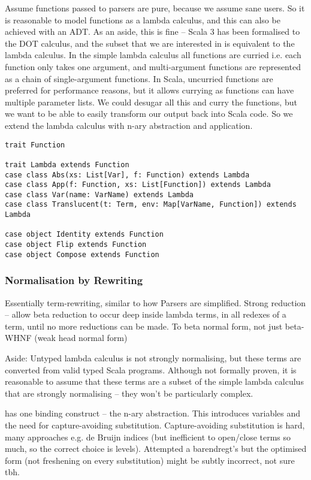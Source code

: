 \documentclass[../../main.tex]{subfiles}
\begin{document}
Assume functions passed to parsers are pure, because we assume sane users.
So it is reasonable to model functions as a lambda calculus, and this can also be achieved with an ADT.
As an aside, this is fine -- Scala 3 has been formalised to the DOT calculus, and the subset that we are interested in is equivalent to the lambda calculus.
In the simple lambda calculus all functions are curried i.e. each function only takes one argument, and multi-argument functions are represented as a chain of single-argument functions.
In Scala, uncurried functions are preferred for performance reasons, but it allows currying as functions can have multiple parameter lists.
We could desugar all this and curry the functions, but we want to be able to easily transform our output back into Scala code.
So we extend the lambda calculus with n-ary abstraction and application.

\begin{verbatim}
trait Function

trait Lambda extends Function
case class Abs(xs: List[Var], f: Function) extends Lambda
case class App(f: Function, xs: List[Function]) extends Lambda
case class Var(name: VarName) extends Lambda
case class Translucent(t: Term, env: Map[VarName, Function]) extends Lambda

case object Identity extends Function
case object Flip extends Function
case object Compose extends Function
\end{verbatim}

\subsubsection{Normalisation by Rewriting}
Essentially term-rewriting, similar to how Parsers are simplified.
Strong reduction -- allow beta reduction to occur deep inside lambda terms, in all redexes of a term, until no more reductions can be made.
To beta normal form, not just beta-WHNF (weak head normal form) %

Aside: Untyped lambda calculus is not strongly normalising, but these terms are converted from valid typed Scala programs.
Although not formally proven, it is reasonable to assume that these terms are a subset of the simple lambda calculus that are strongly normalising -- they won't be particularly complex.

 has one binding construct -- the n-ary abstraction. This introduces variables and the need for capture-avoiding substitution.
Capture-avoiding substitution is hard, many approaches e.g. de Bruijn indices (but inefficient to open/close terms so much, so the correct choice is levels).
Attempted a barendregt's but the optimised form (not freshening on every substitution) might be subtly incorrect, not sure tbh.
\end{document}
